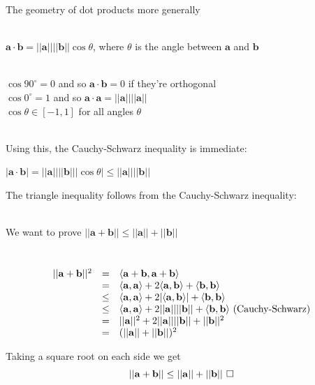 \documentclass[10pt]{seminar}
\begin{document}
\begin{slide}
\newslide
The geometry of dot products more generally

\ \\$\mathbf{a} \cdot \mathbf{b}=||\mathbf{a}||||\mathbf{b}||\cos \theta$, where $\theta $ is the angle between $\mathbf{a}$ and $\mathbf{b}$

\ \\$\cos 90^\circ =0$  and so $\mathbf{a} \cdot \mathbf{b}=0$ if they're orthogonal
\ \\$\cos 0^\circ =1$ and so $\mathbf{a} \cdot \mathbf{a} = ||\mathbf{a}|| || \mathbf{a}||$
\ \\$\cos \theta\in [-1, 1]$ for all angles $\theta$


\ \\Using this, the Cauchy-Schwarz inequality is immediate:

$|\mathbf{a}\cdot \mathbf{b}|=||\mathbf{a}||   ||\mathbf{b}||  |\cos \theta |\leq ||\mathbf{a}||||\mathbf{b}||$


\newslide

The triangle inequality follows from the Cauchy-Schwarz inequality:

\ \\We want to prove $||\mathbf{a}+\mathbf{b}||\leq ||\mathbf{a}||+||\mathbf{b}||$

\ \\ $$\begin{array}{rcl}||\mathbf{a}+\mathbf{b}||^2&=&\langle\mathbf{a}+\mathbf{b}, \mathbf{a}+\mathbf{b}\rangle\\

&=&\langle \mathbf{a}, \mathbf{a}\rangle +2 \langle \mathbf{a}, \mathbf{b}\rangle+\langle \mathbf{b}, \mathbf{b}\rangle\\
&\leq &\langle \mathbf{a}, \mathbf{a}\rangle +2 |\langle \mathbf{a}, \mathbf{b}\rangle|+\langle \mathbf{b}, \mathbf{b}\rangle\\
&\leq &\langle \mathbf{a}, \mathbf{a}\rangle +2 || \mathbf{a}||  ||\mathbf{b}||+\langle \mathbf{b}, \mathbf{b}\rangle \hbox{ (Cauchy-Schwarz)}\\
&= &||\mathbf{a}||^2 +2 || \mathbf{a}||  ||\mathbf{b}||+ ||\mathbf{b}||^2\\
&=&(||\mathbf{a}||+||\mathbf{b}||)^2
\end{array}
$$

Taking a square root on each side we get $$||\mathbf{a}+\mathbf{b}||\leq ||\mathbf{a}||+||\mathbf{b}||  \hspace{.05in}\Box$$ 

\newslide


\end{slide}
\end{document}
